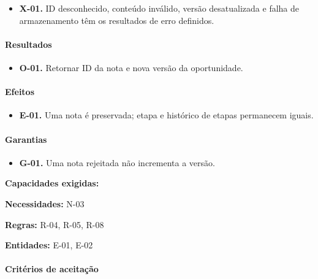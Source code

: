 \documentclass[10pt,a4paper]{article}
\begin{document}
\begin{itemize}

\item \textbf{X-01.} ID desconhecido, conteúdo inválido, versão desatualizada e falha de armazenamento têm os resultados de erro definidos.

\end{itemize}

\paragraph{Resultados}

\begin{itemize}

\item \textbf{O-01.} Retornar ID da nota e nova versão da oportunidade.

\end{itemize}

\paragraph{Efeitos}

\begin{itemize}

\item \textbf{E-01.} Uma nota é preservada; etapa e histórico de etapas permanecem iguais.

\end{itemize}

\paragraph{Garantias}

\begin{itemize}

\item \textbf{G-01.} Uma nota rejeitada não incrementa a versão.

\end{itemize}

\textbf{Capacidades exigidas:} 

\textbf{Necessidades:} N-03

\textbf{Regras:} R-04, R-05, R-08

\textbf{Entidades:} E-01, E-02

\paragraph{Critérios de aceitação}
\end{document}

